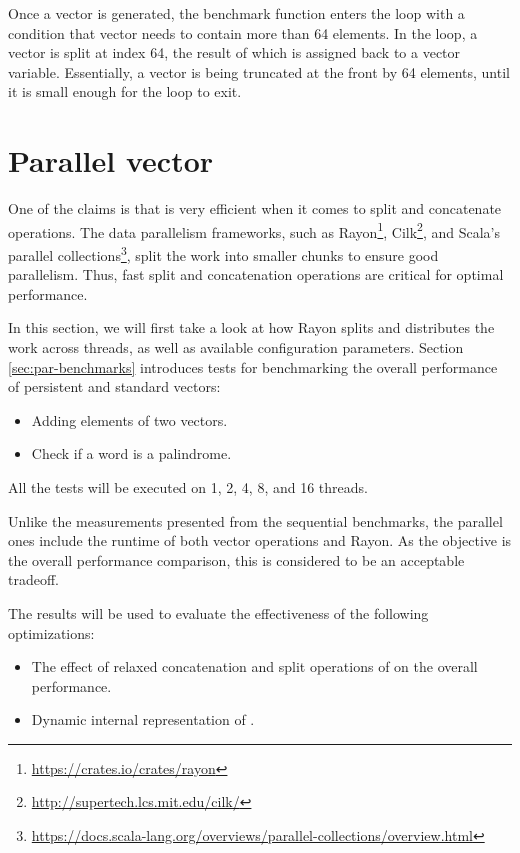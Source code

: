 Once a vector is generated, the benchmark function enters the loop with a condition that vector needs to contain more than 64 elements. In the loop, a vector is split at index 64, the result of which is assigned back to a vector variable. Essentially, a vector is being truncated at the front by 64 elements, until it is small enough for the loop to exit.

\section{Parallel vector}
One of the claims is that \rrbvec{} is very efficient when it comes to split and concatenate operations. The data parallelism frameworks, such as Rayon\footnote{\url{https://crates.io/crates/rayon}}, Cilk\footnote{\url{http://supertech.lcs.mit.edu/cilk/}}, and Scala's parallel collections\footnote{\url{https://docs.scala-lang.org/overviews/parallel-collections/overview.html}}, split the work into smaller chunks to ensure good parallelism. Thus, fast split and concatenation operations are critical for optimal performance.

In this section, we will first take a look at how Rayon splits and distributes the work across threads, as well as available configuration parameters. Section \ref{sec:par-benchmarks} introduces tests for benchmarking the overall performance of persistent and standard vectors:

\begin{itemize}
    \item Adding elements of two vectors.
    \item Check if a word is a palindrome.
\end{itemize}

All the tests will be executed on 1, 2, 4, 8, and 16 threads.

Unlike the measurements presented from the sequential benchmarks, the parallel ones include the runtime of both vector operations and Rayon. As the objective is the overall performance comparison, this is considered to be an acceptable tradeoff.

The results will be used to evaluate the effectiveness of the following optimizations:
\begin{itemize}
    \item The effect of relaxed concatenation and split operations of \rrbvec{} on the overall performance.
    \item Dynamic internal representation of \pvec{}.
\end{itemize}

